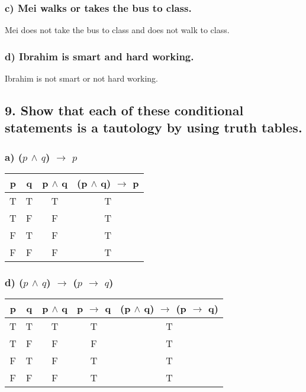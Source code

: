 \documentclass[11pt, oneside]{article} %
\numberwithin{equation}{section} %
\numberwithin{figure}{section} %
\numberwithin{table}{section} %
\begin{document}
\subsubsection{c) Mei walks or takes the bus to class.}
Mei does not take the bus to class and does not walk to class.
\subsubsection{d) Ibrahim is smart and hard working.}
Ibrahim is not smart or not hard working.

\begin{table}[!htbp]
\subsection{9. Show that each of these conditional statements is a tautology by using truth tables.}
\subsubsection{a) ($p$ $\wedge$ $q$) $\rightarrow$ $p$}
\begin{tabular}{c c c c}
\hline\hline
p & q & p $\wedge$ q & (p $\wedge$ q) $\rightarrow$ p \\ [0.5ex] 
\hline
T & T & T & T\\
T & F & F & T\\
F & T & F & T\\
F & F & F & T\\ [1ex]
\hline
\end{tabular}
\label{table:nonlin}
\end{table}

\begin{table}[!htbp]
\subsubsection{d) ($p$ $\wedge$ $q$) $\rightarrow$ ($p$  $\rightarrow$ $q$)}
\begin{tabular}{c c c c c}
\hline\hline
p & q & p $\wedge$ q & p $\rightarrow$ q & (p $\wedge$ q) $\rightarrow$ (p  $\rightarrow$ q) \\ [0.5ex] 
\hline
T & T & T & T & T\\
T & F & F & F & T\\
F & T & F & T & T\\
F & F & F & T & T\\ [1ex]
\hline
\end{tabular}
\label{table:nonlin}
\end{table}
\end{document}
